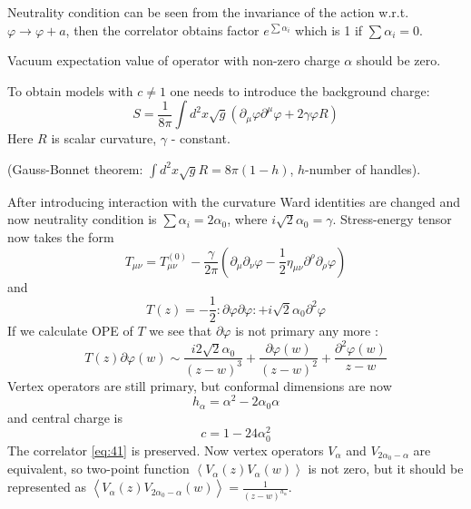 \documentclass[12pt]{article}
\begin{document}
Neutrality condition can be seen from the invariance of the action w.r.t. $\varphi\to\varphi+a$,
then the correlator obtains factor $e^{\sum \alpha_{i}}$ which is 1 if $\sum \alpha_{i}=0$.

Vacuum expectation value of operator with non-zero charge $\alpha$ should be zero. 

To obtain models with $c\neq 1$ one needs to introduce the background charge:
\begin{equation}
  \label{eq:44}
  S=\frac{1}{8\pi} \int d^{2}x \sqrt{g} (\partial_{\mu}\varphi\partial^{\mu}\varphi+2\gamma\varphi R)
\end{equation}
Here $R$ is scalar curvature, $\gamma$ - constant. 

(Gauss-Bonnet theorem: $\int d^{2}x \sqrt{g} R = 8\pi(1-h)$, $h$-number of handles).

After introducing interaction with the curvature Ward identities are changed and now neutrality
condition is $\sum \alpha_{i}=2\alpha_{0}$, where $i\sqrt{2}\alpha_{0}=\gamma$. 
Stress-energy tensor now takes the form
\begin{equation}
  \label{eq:45}
  T_{\mu\nu}=T^{(0)}_{\mu\nu}-\frac{\gamma}{2\pi}\left(\partial_{\mu}\partial_{\nu}\varphi-\frac{1}{2}\eta_{\mu\nu}\partial^{\rho}\partial_{\rho}\varphi\right)
\end{equation}
and
\begin{equation}
  \label{eq:46}
  T(z)=-\frac{1}{2}:\partial \varphi\partial\varphi:+i\sqrt{2}\alpha_{0}\partial^{2}\varphi
\end{equation}
If we calculate OPE of $T$ we see that $\partial\varphi$ is not primary any more \cite{difrancesco1997cft}:
\begin{equation}
  \label{eq:47}
  T(z)\partial\varphi(w)\sim
  \frac{i2\sqrt{2}\alpha_{0}}{(z-w)^{3}}+\frac{\partial\varphi(w)}{(z-w)^{2}} +\frac{\partial^{2}\varphi(w)}{z-w}
\end{equation}
Vertex operators are still primary, but conformal dimensions are now
\begin{equation}
  \label{eq:48}
  h_{\alpha}=\alpha^{2}-2\alpha_{0}\alpha
\end{equation}
and central charge is
\begin{equation}
  \label{eq:49}
  c=1-24\alpha_{0}^{2}
\end{equation}
The correlator \eqref{eq:41} is preserved. Now vertex operators $V_{\alpha}$ and
$V_{2\alpha_{0}-\alpha}$ are equivalent, so two-point function
$\left<V_{\alpha}(z)V_{\alpha}(w)\right>$  is not zero, but it should be represented as
$\left<V_{\alpha}(z)V_{2\alpha_{0}-\alpha}(w)\right>=\frac{1}{(z-w)^{h_{\alpha}}}$. 
\end{document}
